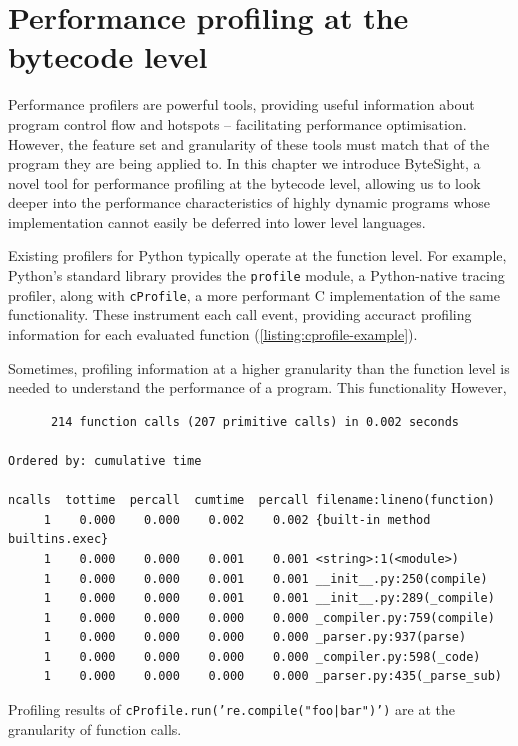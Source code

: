 \chapter{Performance profiling at the bytecode level} %
\label{chap:profiling-bytecode}

Performance profilers are powerful tools, providing useful information about program control flow and hotspots -- facilitating performance optimisation.
However, the feature set and granularity of these tools must match that of the program they are being applied to.
In this chapter we introduce ByteSight, a novel tool for performance profiling at the bytecode level, allowing us to look deeper into the performance characteristics of highly dynamic programs whose implementation cannot easily be deferred into lower level languages.


Existing profilers for Python typically operate at the function level.
For example, Python's standard library provides the \texttt{profile} module, a Python-native tracing profiler, along with \texttt{cProfile}, a more performant C implementation of the same functionality. These instrument each call event, providing accuract profiling information for each evaluated function (\autoref{listing:cprofile-example}).


Sometimes, profiling information at a higher granularity than the function level is needed to understand the performance of a program. This functionality
However,


\vspace{1em}
\begin{code}
    \centering
    \begin{verbatim}
      214 function calls (207 primitive calls) in 0.002 seconds

Ordered by: cumulative time

ncalls  tottime  percall  cumtime  percall filename:lineno(function)
     1    0.000    0.000    0.002    0.002 {built-in method builtins.exec}
     1    0.000    0.000    0.001    0.001 <string>:1(<module>)
     1    0.000    0.000    0.001    0.001 __init__.py:250(compile)
     1    0.000    0.000    0.001    0.001 __init__.py:289(_compile)
     1    0.000    0.000    0.000    0.000 _compiler.py:759(compile)
     1    0.000    0.000    0.000    0.000 _parser.py:937(parse)
     1    0.000    0.000    0.000    0.000 _compiler.py:598(_code)
     1    0.000    0.000    0.000    0.000 _parser.py:435(_parse_sub)
    \end{verbatim}
        \caption{Profiling results of \texttt{cProfile.run('re.compile("foo|bar")')} are at the granularity of function calls.}
        \label{listing:cprofile-example}
\end{code}

